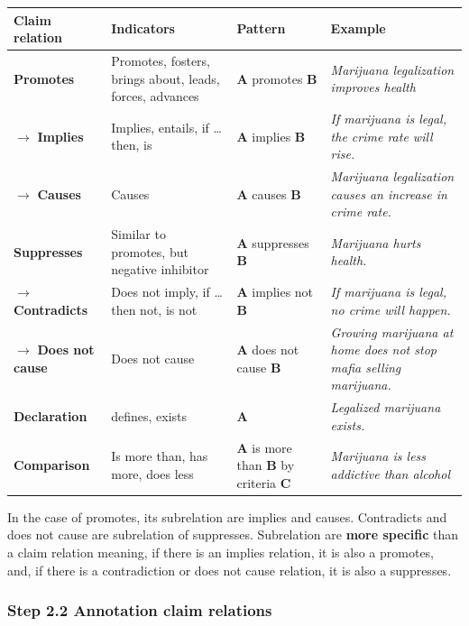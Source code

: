\begin{tabular}{| l | p{3.5cm} | p{3cm} | p{5cm}| }
\toprule
\cellcolor{gray!25} Claim relation & \cellcolor{gray!25}Indicators &
\cellcolor{gray!25}Pattern & \cellcolor{gray!25}Example \\
\midrule
	\textbf{Promotes} & 
	Promotes, fosters, brings about, leads, forces, advances & 
	\textbf{A} promotes \textbf{B} &
\textit{Marijuana legalization improves health} \\
\midrule
	$\rightarrow$ \textbf{Implies} & 
	Implies, entails, if \dots then, is &
	\textbf{A} implies \textbf{B} &
\textit{If marijuana is legal, the crime rate will rise. } \\
\midrule
	$\rightarrow$ \textbf{Causes} &
	Causes &
	\textbf{A} causes \textbf{B} &
\textit{Marijuana legalization causes an increase in crime rate.} \\
\midrule
	\textbf{Suppresses} &
	Similar to promotes, but negative inhibitor &
	\textbf{A} suppresses \textbf{B} &
	\textit{ Marijuana hurts health. } \\
	\midrule
	$\rightarrow$ \textbf{Contradicts} &
	Does not imply, if \dots then not, is not &
	\textbf{A} implies not \textbf{B} &
\textit{If marijuana is legal, no crime will happen. } \\
\midrule
	$\rightarrow$ \textbf{Does not cause} &
	Does not cause &
	\textbf{A} does not cause \textbf{B} &
\textit{Growing marijuana at home does not stop mafia selling marijuana. } \\
\midrule
	\textbf{Declaration} &
	defines, exists &
	\textbf{A} &
\textit{Legalized marijuana exists.} \\
\midrule
	\textbf{Comparison} & 
	Is more than, has more, does less &
	\textbf{A} is more than \textbf{B} by criteria \textbf{C} &
\textit{Marijuana is less addictive than alcohol} \\
\bottomrule
\end{tabular}

In the case of promotes, its subrelation are implies and causes. Contradicts
and does not cause are subrelation of suppresses. Subrelation are \textbf{more specific}
than a claim relation meaning, if there is an implies relation, it is also a
promotes, and, if there is a contradiction or does not cause relation, it is
also a suppresses. 

\subsubsection{Step 2.2 Annotation claim relations}

